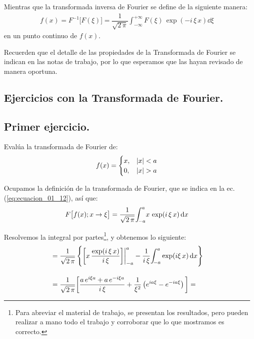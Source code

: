 Mientras que la transformada inversa de Fourier se define de la siguiente manera:
\begin{align}
f(x) = F^{-1} \big[ F(\xi) \big] = \dfrac{1}{\sqrt{2 \, \pi}} \int_{-\infty}^{+\infty} F(\xi) \, \exp(-i \, \xi \, x) \dd{\xi}
\label{eq:ecuacion_01_13}
\end{align}
en un punto continuo de $f(x)$.

Recuerden que el detalle de las propiedades de la Transformada de Fourier se indican en las notas de trabajo, por lo que esperamos que las hayan revisado de manera oportuna.

\subsection{Ejercicios con la Transformada de Fourier.}

\subsection*{Primer ejercicio.}

Evalúa la transformada de Fourier de:
\begin{align*}
f(x) = \begin{cases}
x, & \abs{x} < a \\
0, & \abs{x} > a
\end{cases}
\end{align*}

Ocupamos la definición de la transformada de Fourier, que se indica en la ec. (\ref{eq:ecuacion_01_12}), así que:
\begin{align*}
F \big[ f(x); x \to \xi \big] = \dfrac{1}{\sqrt{2 \, \pi}} \scaleint{5ex}_{\bs -a}^{a} x \, \exp(i \, \xi \, x) \dd{x}
\end{align*}

Resolvemos la integral por partes\footnote{Para abreviar el material de trabajo, se presentan los resultados, pero pueden realizar a mano todo el trabajo y corroborar que lo que mostramos es correcto.}, y obtenemos lo siguiente:
\begin{align*}
&= \dfrac{1}{\sqrt{2 \, \pi}} \left\{ \bigg[ x \, \dfrac{\exp(i \, \xi \, x)}{i \, \xi} \bigg] \bigg\vert_{-a}^{a} - \dfrac{1}{i \, \xi} \scaleint{5ex}_{\bs -a}^{a} \exp(i \xi \, x) \dd{x} \right\} \\[1em] 
&= \dfrac{1}{\sqrt{2 \, \pi}} \bigg[ \dfrac{a \, e^{i \xi a} + a \, e^{-i \xi a}}{i \, \xi} + \dfrac{1}{\xi^{2}} \left( e^{i a \xi} - e^{-i a \xi} \right) \bigg] =
\end{align*}

